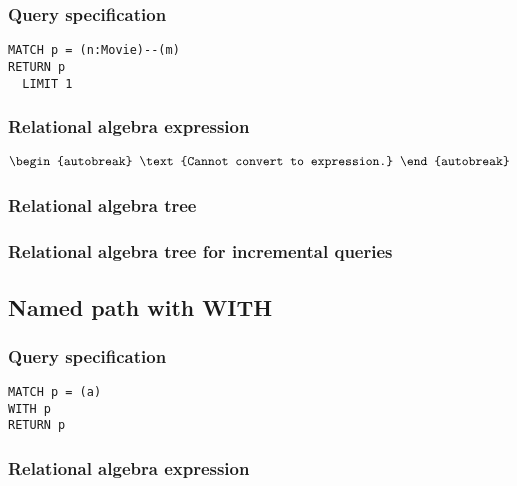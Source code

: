 \subsubsection*{Query specification}

\begin{lstlisting}
MATCH p = (n:Movie)--(m)
RETURN p
  LIMIT 1
\end{lstlisting}

\subsubsection*{Relational algebra expression}

\begin{align*}
\begin{autobreak}
\text{Cannot convert to expression.}
\end{autobreak}
\end{align*}

\subsubsection*{Relational algebra tree}


\subsubsection*{Relational algebra tree for incremental queries}


\subsection{Named path with WITH}

\subsubsection*{Query specification}

\begin{lstlisting}
MATCH p = (a)
WITH p
RETURN p
\end{lstlisting}

\subsubsection*{Relational algebra expression}

